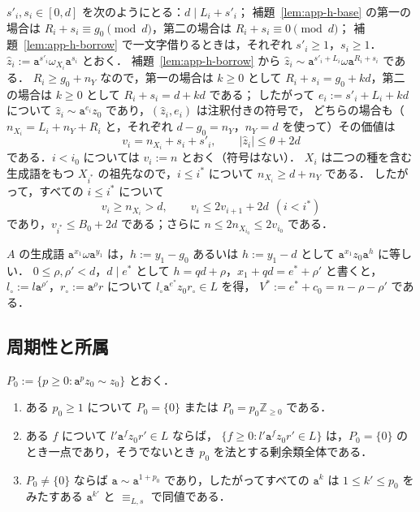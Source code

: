 $s'_i,s_i\in[0,d]$ を次のようにとる：$d\mid L_i+s'_i$；
補題~\ref{lem:app-h-base} の第一の場合は $R_i+s_i\equiv g_0\pmod d$，第二の場合は $R_i+s_i\equiv0\pmod d$；
補題~\ref{lem:app-h-borrow} で一文字借りるときは，それぞれ $s'_i\ge1$，$s_i\ge1$．
$\hat z_i:=\mathtt a^{s'_i}\omega_{X_i}\mathtt a^{s_i}$ とおく．
補題~\ref{lem:app-h-borrow} から $\hat z_i\sim\mathtt a^{s'_i+L_i}\omega\mathtt a^{R_i+s_i}$ である．
$R_i\ge g_0+n_Y$ なので，第一の場合は $k\ge0$ として $R_i+s_i=g_0+kd$，第二の場合は $k\ge0$ として $R_i+s_i=d+kd$ である；
したがって $e_i:=s'_i+L_i+kd$ について $\hat z_i\sim\mathtt a^{e_i}z_0$ であり，$(\hat z_i,e_i)$ は注釈付きの符号で，
どちらの場合も（$n_{X_i}=L_i+n_Y+R_i$ と，それぞれ $d-g_0=n_Y$，$n_Y=d$ を使って）その価値は
\[
 v_i=n_{X_i}+s_i+s'_i,\qquad|\hat z_i|\le\theta+2d
\]
である．$i<i_0$ については $v_i:=n$ とおく（符号はない）．
$X_i$ は二つの種を含む生成語をもつ $X_{i^*}$ の祖先なので，$i\le i^*$ について $n_{X_i}\ge d+n_Y$ である．
したがって，すべての $i\le i^*$ について
\begin{equation}
\label{eq:app-h-star}
 v_i\ge n_{X_i}>d,\qquad v_i\le2v_{i+1}+2d\ \ (i<i^*)
\end{equation}
であり，$v_{i^*}\le B_0+2d$ である；さらに $n\le2n_{X_{i_0}}\le2v_{i_0}$ である．

$A$ の生成語 $\mathtt a^{x_1}\omega\mathtt a^{y_1}$ は，$h:=y_1-g_0$ あるいは $h:=y_1-d$ として $\mathtt a^{x_1}z_0\mathtt a^{h}$ に等しい．
$0\le\rho,\rho'<d$，$d\mid e^*$ として $h=qd+\rho$，$x_1+qd=e^*+\rho'$ と書くと，
$l_\circ:=l\mathtt a^{\rho'}$，$r_\circ:=\mathtt a^\rho r$ について $l_\circ\mathtt a^{e^*}z_0r_\circ\in L$ を得，
$V^*:=e^*+c_0=n-\rho-\rho'$ である．

\subsection{周期性と所属}

\begin{lemma}
\label{lem:app-h-period}
$P_0:=\{p\ge0:\mathtt a^pz_0\sim z_0\}$ とおく．
\begin{enumerate}[label=\textup{(\roman*)},leftmargin=*]
\item ある $p_0\ge1$ について $P_0=\{0\}$ または $P_0=p_0\mathbb Z_{\ge0}$ である．
\item ある $f$ について $l'\mathtt a^fz_0r'\in L$ ならば，
$\{f\ge0:l'\mathtt a^fz_0r'\in L\}$ は，$P_0=\{0\}$ のとき一点であり，そうでないとき $p_0$ を法とする剰余類全体である．
\item $P_0\ne\{0\}$ ならば $\mathtt a\sim\mathtt a^{1+p_0}$ であり，したがってすべての $\mathtt a^k$ は $1\le k'\le p_0$ をみたすある $\mathtt a^{k'}$ と $\equiv_{L,s}$ で同値である．
\end{enumerate}
\end{lemma}

